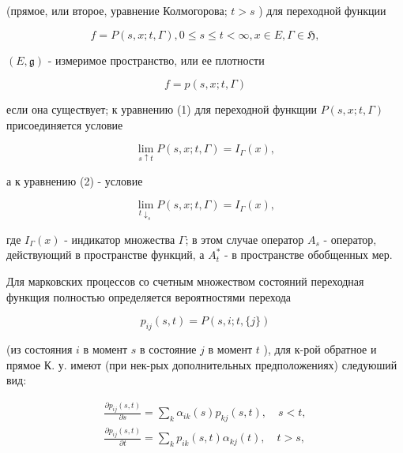 \documentclass[10pt]{article}
\begin{document}
(прямое, или второе, уравнение Колмогорова; $t>s$ ) для переходной функции



\[

f=P(s, x ; t, \Gamma), 0 \leqslant s \leqslant t<\infty, x \in E, \Gamma \in \mathfrak{H},

\]



$(E, \mathfrak{g})$ - измеримое пространство, или ее плотности



\[

f=p(s, x ; t, \Gamma)

\]



если она существует; к уравнению (1) для переходной функщии $P(s, x ; t, \Gamma)$ присоединяется условие



\[

\lim _{s \uparrow t} P(s, x ; t, \Gamma)=I_{\Gamma}(x),

\]



а к уравнению (2) - условие



\[

\lim _{t \downarrow_{s}} P(s, x ; t, \Gamma)=I_{\Gamma}(x),

\]



где $I_{\Gamma}(x)$ - индикатор множества $\Gamma$; в этом случае оператор $A_{s}$ - оператор, действующий в пространстве функций, а $A_{t}^{*}$ - в пространстве обобщенных мер.



Для марковских процессов со счетным множеством состояний переходная функщия полностью определяется вероятностями перехода



\[

p_{i j}(s, t)=P(s, i ; t,\{j\})

\]



(из состояния $i$ в момент $s$ в состояние $j$ в момент $t$ ), для к-рой обратное и прямое К. у. имеют (при нек-рых дополнительных предположениях) следуюший вид:



\[

\begin{array}{ll}

\frac{\partial p_{i j}(s, t)}{\partial s}=\sum_{k} \alpha_{i k}(s) p_{k j}(s, t), \quad s<t, \\

\frac{\partial p_{i j}(s, t)}{\partial t}=\sum_{k} p_{i k}(s, t) \alpha_{k j}(t), \quad t>s,

\end{array}

\]
\end{document}
